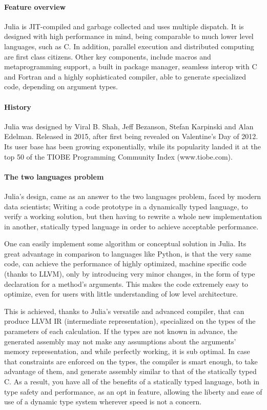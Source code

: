 \documentclass[11pt,a4paper,english,greek,twoside]{thesis}
\begin{document}
\paragraph{Feature overview}\label{feature-overview}

Julia is JIT-compiled and garbage collected and uses multiple dispatch.
It is designed with high performance in mind, being comparable to much
lower level languages, such as C. In addition, parallel execution and
distributed computing are first class citizens. Other key components,
include macros and metaprogramming support, a built in package manager,
seamless interop with C and Fortran and a highly sophisticated compiler,
able to generate specialized code, depending on argument types.

\paragraph{History}\label{history}

Julia was designed by Viral B. Shah, Jeff Bezanson, Stefan Karpinski and
Alan Edelman. Released in 2015, after first being revealed on
Valentine's Day of 2012. Its user base has been growing exponentially,
while its popularity landed it at the top 50 of the TIOBE Programming
Community Index (www.tiobe.com).

\paragraph{The two languages problem}\label{the-two-languages-problem}

Julia's design, came as an answer to the two languages problem, faced by
modern data scientists; Writing a code prototype in a dynamically typed
language, to verify a working solution, but then having to rewrite a
whole new implementation in another, statically typed language in order
to achieve acceptable performance.

One can easily implement some algorithm or conceptual solution in Julia.
Its great advantage in comparison to languages like Python, is that the
very same code, can achieve the performance of highly optimized, machine
specific code (thanks to LLVM), only by introducing very minor changes,
in the form of type declaration for a method's arguments. This makes the
code extremely easy to optimize, even for users with little
understanding of low level architecture.

This is achieved, thanks to Julia's versatile and advanced compiler,
that can produce LLVM IR (intermediate representation), specialized on
the types of the parameters of each calculation. If the types are not
known in advance, the generated assembly may not make any assumptions
about the arguments' memory representation, and while perfectly working,
it is sub optimal. In case that constraints are enforced on the types,
the compiler is smart enough, to take advantage of them, and generate
assembly similar to that of the statically typed C. As a result, you
have all of the benefits of a statically typed language, both in type
safety and performance, as an opt in feature, allowing the liberty and
ease of use of a dynamic type system wherever speed is not a concern.
\end{document}
